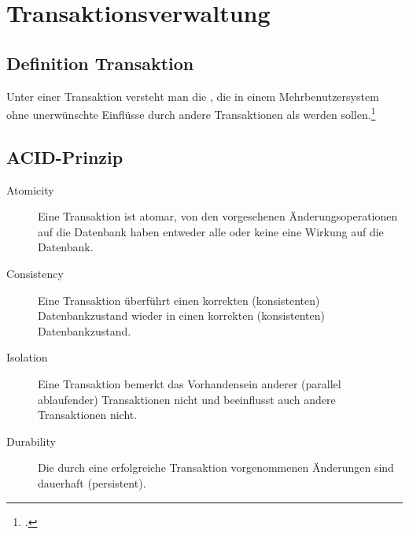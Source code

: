 \documentclass{bschlangaul-theorie}
\begin{document}
\chapter{Transaktionsverwaltung}

\section{Definition Transaktion}

Unter einer Transaktion versteht man die , die in einem Mehrbenutzersystem ohne unerwünschte
Einflüsse durch andere Transaktionen als  werden sollen.\footcite[Seite 1]{db:fs:5}

%

\section{ACID-Prinzip}

\begin{bQuellen}
\item \cite[Kapitel 9.5 „Eigenschaften von Transaktionen“, Seite 305]{kemper}
\item \cite[Seite 1]{db:fs:5}
\item \cite{wiki:acid}
\end{bQuellen}

\begin{description}
\item[Atomicity]

Eine Transaktion ist atomar, \dh von den vorgesehenen
Änderungsoperationen auf die Datenbank haben entweder alle oder keine
eine Wirkung auf die Datenbank.

\item[Consistency]

Eine Transaktion überführt einen korrekten (konsistenten)
Datenbankzustand wieder in einen korrekten (konsistenten)
Datenbankzustand.

\item[Isolation]

Eine Transaktion bemerkt das Vorhandensein anderer (parallel
ablaufender) Transaktionen nicht und beeinflusst auch andere
Transaktionen nicht.

\item[Durability]

Die durch eine erfolgreiche Transaktion vorgenommenen Änderungen sind
dauerhaft (persistent).
\end{description}
\end{document}
